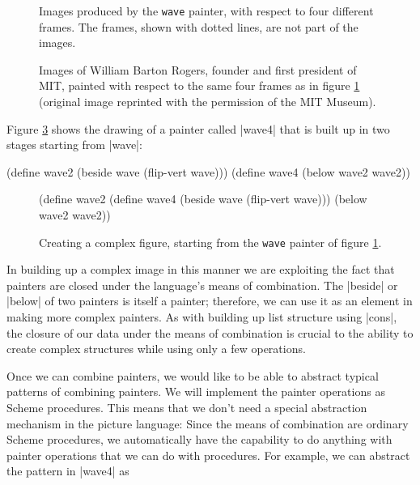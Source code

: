 \begin{Exercise}
\begin{Exercise}
\begin{Exercise}
\begin{figure}
\centering
\placeholder
\caption{Images produced by the \texttt{wave} painter, with respect to
  four different frames.  The frames, shown with dotted lines, are not
  part of the images.}
\label{fig:2.10}
\end{figure}

\begin{figure}
  \centering
  \placeholder
  \caption{Images of William Barton Rogers, founder and first
    president of MIT, painted with respect to the same four frames as
    in figure \ref{fig:2.10} (original image reprinted with the
    permission of the MIT Museum).}
  \label{fig:2.11}
\end{figure}


Figure \ref{fig:2.12} shows the drawing of a painter called
\scheme|wave4| that is built up in two stages starting from \scheme|wave|:
\begin{schemedisplay}
(define wave2 (beside wave (flip-vert wave)))
(define wave4 (below wave2 wave2))
\end{schemedisplay}

\begin{figure}
  \centering
\placeholder
  \begin{schemedisplay}
    (define wave2                         (define wave4
      (beside wave (flip-vert wave)))       (below wave2 wave2))
  \end{schemedisplay}
  \caption{Creating a complex figure, starting from the \texttt{wave} painter of figure \ref{fig:2.10}.}
  \label{fig:2.12}
\end{figure}

In building up a complex image in this manner we are exploiting the
fact that painters are closed under the language's means of
combination.  The \scheme|beside| or \scheme|below| of two painters is
itself a painter; therefore, we can use it as an element in making
more complex painters.  As with building up list structure using \scheme|cons|, the closure of our data under the means of combination is
crucial to the ability to create complex structures while using only a
few operations.


Once we can combine painters, we would like to be able to abstract
typical patterns of combining painters.
We will implement the painter operations as Scheme procedures.
This means that we don't need a special abstraction mechanism
in the picture language:
Since the means of combination
are ordinary Scheme procedures, we automatically have the capability
to do anything with painter operations that we can do with
procedures.
For example, we can abstract the pattern in \scheme|wave4| as



\end{Exercise}
\end{Exercise}
\end{Exercise}
